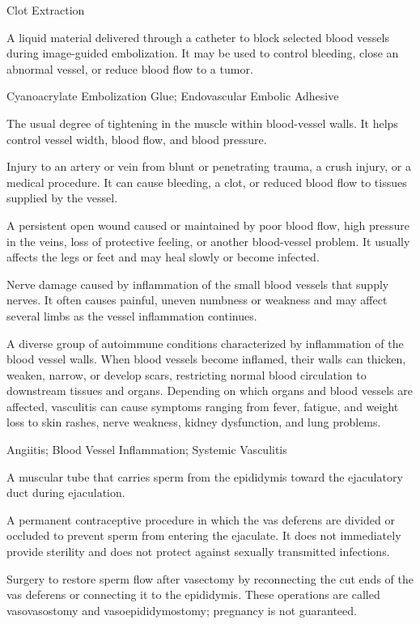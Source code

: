 \synonyms
Clot Extraction

 A liquid material delivered through a catheter to block selected blood vessels during image-guided embolization. It may be used to control bleeding, close an abnormal vessel, or reduce blood flow to a tumor.

\synonyms
Cyanoacrylate Embolization Glue; Endovascular Embolic Adhesive

 The usual degree of tightening in the muscle within blood-vessel walls. It helps control vessel width, blood flow, and blood pressure.

 Injury to an artery or vein from blunt or penetrating trauma, a crush injury, or a medical procedure. It can cause bleeding, a clot, or reduced blood flow to tissues supplied by the vessel.

 A persistent open wound caused or maintained by poor blood flow, high pressure in the veins, loss of protective feeling, or another blood-vessel problem. It usually affects the legs or feet and may heal slowly or become infected.


 Nerve damage caused by inflammation of the small blood vessels that supply nerves. It often causes painful, uneven numbness or weakness and may affect several limbs as the vessel inflammation continues.

 A diverse group of autoimmune conditions characterized by inflammation of the blood vessel walls. When blood vessels become inflamed, their walls can thicken, weaken, narrow, or develop scars, restricting normal blood circulation to downstream tissues and organs. Depending on which organs and blood vessels are affected, vasculitis can cause symptoms ranging from fever, fatigue, and weight loss to skin rashes, nerve weakness, kidney dysfunction, and lung problems.

\synonyms
Angiitis; Blood Vessel Inflammation; Systemic Vasculitis

 A muscular tube that carries sperm from the epididymis toward the ejaculatory duct during ejaculation.

 A permanent contraceptive procedure in which the vas deferens are divided or occluded to prevent sperm from entering the ejaculate. It does not immediately provide sterility and does not protect against sexually transmitted infections.

 Surgery to restore sperm flow after vasectomy by reconnecting the cut ends of the vas deferens or connecting it to the epididymis. These operations are called vasovasostomy and vasoepididymostomy; pregnancy is not guaranteed.

